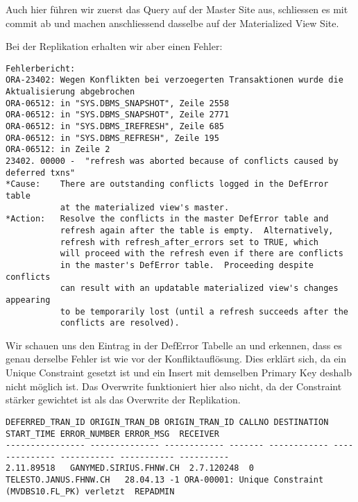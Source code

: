 \documentclass[11pt,a4paper,parskip=half]{scrartcl}
\begin{document}
Auch hier führen wir zuerst das Query auf der Master Site aus, schliessen es mit commit ab und machen anschliessend dasselbe auf der Materialized View Site.

Bei der Replikation erhalten wir aber einen Fehler:
\begin{lstlisting}
Fehlerbericht:
ORA-23402: Wegen Konflikten bei verzoegerten Transaktionen wurde die Aktualisierung abgebrochen
ORA-06512: in "SYS.DBMS_SNAPSHOT", Zeile 2558
ORA-06512: in "SYS.DBMS_SNAPSHOT", Zeile 2771
ORA-06512: in "SYS.DBMS_IREFRESH", Zeile 685
ORA-06512: in "SYS.DBMS_REFRESH", Zeile 195
ORA-06512: in Zeile 2
23402. 00000 -  "refresh was aborted because of conflicts caused by deferred txns"
*Cause:    There are outstanding conflicts logged in the DefError table
           at the materialized view's master.
*Action:   Resolve the conflicts in the master DefError table and
           refresh again after the table is empty.  Alternatively,
           refresh with refresh_after_errors set to TRUE, which
           will proceed with the refresh even if there are conflicts
           in the master's DefError table.  Proceeding despite conflicts
           can result with an updatable materialized view's changes appearing
           to be temporarily lost (until a refresh succeeds after the
           conflicts are resolved).
\end{lstlisting}

Wir schauen uns den Eintrag in der DefError Tabelle an und erkennen, dass es genau derselbe Fehler ist wie vor der Konfliktauflösung. Dies erklärt sich, da ein Unique Constraint gesetzt ist und ein Insert mit demselben Primary Key deshalb nicht möglich ist. Das Overwrite funktioniert hier also nicht, da der Constraint stärker gewichtet ist als das Overwrite der Replikation.
\begin{lstlisting}
DEFERRED_TRAN_ID ORIGIN_TRAN_DB ORIGIN_TRAN_ID CALLNO DESTINATION START_TIME ERROR_NUMBER ERROR_MSG  RECEIVER
---------------- -------------- ------------ ------- ------------ -------------- ----------- ----------- ----------
2.11.89518   GANYMED.SIRIUS.FHNW.CH  2.7.120248  0 TELESTO.JANUS.FHNW.CH   28.04.13 -1 ORA-00001: Unique Constraint (MVDBS10.FL_PK) verletzt  REPADMIN
\end{lstlisting}
\end{document}

